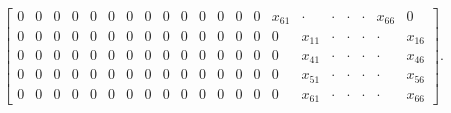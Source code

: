 \documentclass{amsart}
\theoremstyle{definition}
\theoremstyle{remark}
\numberwithin{equation}{section}
\numberwithin{theorem}{section}
\begin{document}
\begin{small}
\[\begin{bmatrix}
0 &0 & 0 & 0 & 0 & 0 & 0  & 0 & 0 &0 & 0 & 0 & 0 & 0  &  x_{61} &  {\cdot} & {\cdot} & {\cdot}& {\cdot} & x_{66} & 0\\
0& 0 &0 & 0 & 0 & 0 & 0 & 0  & 0 & 0 &0 & 0 & 0 & 0 & 0  &   x_{11} &  {\cdot} & {\cdot} & {\cdot}& {\cdot} &x_{16}\\
0& 0 &0 & 0 & 0 & 0 & 0 & 0  & 0 & 0 &0 & 0 & 0 & 0 & 0  &   x_{41} &  {\cdot} & {\cdot} & {\cdot}& {\cdot} & x_{46}   \\
0& 0 &0 & 0 & 0 & 0 & 0 & 0  & 0 & 0 &0 & 0 & 0 & 0 & 0  &   x_{51} & {\cdot} & {\cdot} & {\cdot}& {\cdot} & x_{56}   \\
0& 0 &0 & 0 & 0 & 0 & 0 & 0  & 0 & 0 &0 & 0 & 0 & 0 & 0  &    x_{61} & {\cdot} & {\cdot} & {\cdot}& {\cdot} & x_{66}
\end{bmatrix}.
\]
\end{small}
\end{document}
